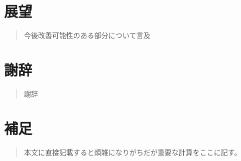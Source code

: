 \documentclass[uplatex,openany,oneside,a4j,11pt]{jsbook}
\begin{document}
\chapter{展望}
    \begin{abstract}
        今後改善可能性のある部分について言及
    \end{abstract}
    

\chapter{謝辞}
    \begin{abstract}
        謝辞
    \end{abstract}
    

\chapter{補足}
    \begin{abstract}
        本文に直接記載すると煩雑になりがちだが重要な計算をここに記す。
    \end{abstract}
    


%
\printbibliography[title=参考文献]
\end{document}
